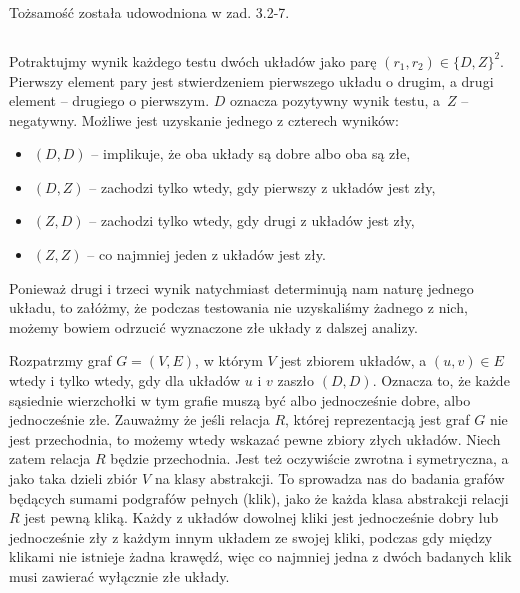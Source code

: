 \subsubsection{} %
Tożsamość została udowodniona w zad. 3.2-7.

\subsection{} %

\subsubsection{} %
Potraktujmy wynik każdego testu dwóch układów jako parę $(r_1,r_2)\in\{D,Z\}^2$. Pierwszy element pary jest stwierdzeniem pierwszego układu o drugim, a drugi element -- drugiego o pierwszym. $D$ oznacza pozytywny wynik testu, a~$Z$ -- negatywny. Możliwe jest uzyskanie jednego z czterech wyników:
\begin{itemize}
	\item $(D,D)$ -- implikuje, że oba układy są dobre albo oba są złe,
	\item $(D,Z)$ -- zachodzi tylko wtedy, gdy pierwszy z układów jest zły,
	\item $(Z,D)$ -- zachodzi tylko wtedy, gdy drugi z układów jest zły,
	\item $(Z,Z)$ -- co najmniej jeden z układów jest zły.
\end{itemize}
Ponieważ drugi i trzeci wynik natychmiast determinują nam naturę jednego układu, to załóżmy, że podczas testowania nie uzyskaliśmy żadnego z nich, możemy bowiem odrzucić wyznaczone złe układy z dalszej analizy.

Rozpatrzmy graf $G=(V,E)$, w którym $V$ jest zbiorem układów, a $(u,v)\in E$ wtedy i tylko wtedy, gdy dla układów $u$ i $v$ zaszło $(D,D)$. Oznacza to, że każde sąsiednie wierzchołki w tym grafie muszą być albo jednocześnie dobre, albo jednocześnie złe. Zauważmy że jeśli relacja $R$, której reprezentacją jest graf $G$ nie jest przechodnia, to możemy wtedy wskazać pewne zbiory złych układów. Niech zatem relacja $R$ będzie przechodnia. Jest też oczywiście zwrotna i symetryczna, a jako taka dzieli zbiór $V$ na klasy abstrakcji. To sprowadza nas do badania grafów będących sumami podgrafów pełnych (klik), jako że każda klasa abstrakcji relacji $R$ jest pewną kliką. Każdy z układów dowolnej kliki jest jednocześnie dobry lub jednocześnie zły z każdym innym układem ze swojej kliki, podczas gdy między klikami nie istnieje żadna krawędź, więc co najmniej jedna z dwóch badanych klik musi zawierać wyłącznie złe układy.

